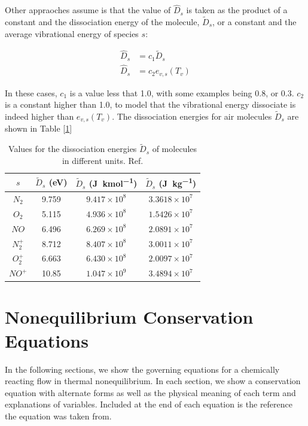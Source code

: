 \documentclass[10pt]{article}
\begin{document}
\begin{flushleft}
\hspace{5mm}
Other appraoches assume is that the value of $\hat{D}_s$ is taken as the product of a constant and the dissociation energy of the molecule, $\tilde{D}_s$, or a constant and the average vibrational energy of species $s$:

\begin{align*}
    \hat{D}_s &= c_1 \tilde{D}_s \\
    \hat{D}_s &= c_2 e_{v,s}(T_v)
\end{align*}

In these cases, $c_1$ is a value less that 1.0, with some examples being 0.8, or 0.3. $c_2$ is a constant higher than 1.0, to model that the vibrational energy dissociate is indeed higher than $e_{v,s}(T_v)$. The dissociation energies for air molecules $\tilde{D}_s$ are shown in Table [\ref{tab:diss-energies}]

\begin{table}[ht]
\centering
\begin{tabular}{cccc}
\hline
$s$ & $\tilde{D}_s$ (eV) & $\tilde{D}_s$ (\si{\joule\per\kilo\mole}) & $\tilde{D}_s$ (\si{\joule\per\kilo\gram}) \\
\hline
$N_2$ & 9.759 & $9.417 \times 10^8$ & $3.3618 \times 10^7$ \\
$O_2$ & 5.115 & $4.936 \times 10^8$ & $1.5426 \times 10^7$ \\
$NO$ & 6.496 & $6.269 \times 10^8$ & $2.0891 \times 10^7$ \\
$N_2^+$ & 8.712 & $8.407 \times 10^8$ & $3.0011 \times 10^7$ \\
$O_2^+$ & 6.663 & $6.430 \times 10^8$ & $2.0097 \times 10^7$ \\
$NO^+$ & 10.85 & $1.047 \times 10^9$ & $3.4894 \times 10^7$ \\
\hline
\end{tabular}
\caption{Values for the dissociation energies $\tilde{D}_s$ of molecules in different units. Ref. \cite{gnoffo1989}}
\label{tab:diss-energies}
\end{table}

\newpage
\section{Nonequilibrium Conservation Equations}

In the following sections, we show the governing equations for a chemically reacting flow in thermal nonequilibrium. In each section, we show a conservation equation with alternate forms as well as the physical meaning of each term and explanations of variables. Included at the end of each equation is the reference the equation was taken from.


\end{flushleft}
\end{document}
